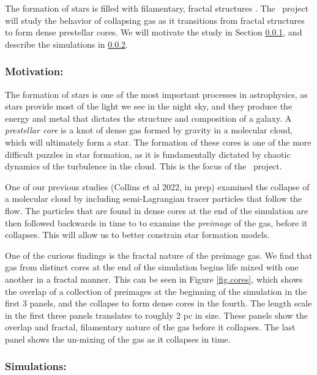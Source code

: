 
The formation of stars is filled with filamentary, fractal structures
\citep{Andre14}.  The
\nameCores\ project will study the behavior of collapsing gas as it transitions
from fractal structures to form dense prestellar cores.  We will motivate the
study in Section \ref{subsec.cores_motivate}, and describe the simulations
in \ref{subsec.cores_sims}.


\subsubsection{Motivation: \nameCores}
\label{subsec.cores_motivate}
The formation of stars is one of the most important processes in astrophysics,
as stars provide most of the light we see in the night sky, and they produce the
energy and metal
that dictates the structure and composition of a galaxy.  
A \emph{prestellar core} is a knot of dense gas
formed by gravity in a molecular cloud, which will ultimately form a star.  The
formation of these cores is one of the more difficult puzzles in star formation,
as it is fundamentally dictated by chaotic dynamics of the turbulence in the
cloud.  This is the focus of the \nameCores\ project.

One of our previous studies (Collins et al 2022, in prep) examined the collapse of a molecular cloud by
including semi-Lagrangian tracer particles that follow the flow.  The particles
that are found in dense cores at the end of the simulation are then followed
backwards in time to 
to examine the \emph{preimage} of the gas, before it collapses.  This will allow
us to better constrain star formation models.  

One of the curious findings is the fractal nature of the preimage gas.  We find
that gas from distinct cores at the end of the simulation begins life mixed with
one another in a fractal manner. This can be seen in Figure
\ref{fig.cores}, which shows the overlap of a collection of preimages at the
beginning of the simulation in the first 3 panels, and the
collapse to form dense cores in the fourth.  The length scale in the first three panels translates to
roughly 2 pc in size.  These panels show the overlap and fractal, filamentary nature of
the gas before it collapses.  The
last panel shows the un-mixing of the gas as it collapses in time.

\subsubsection{Simulations: \nameCores}
\label{subsec.cores_sims}

